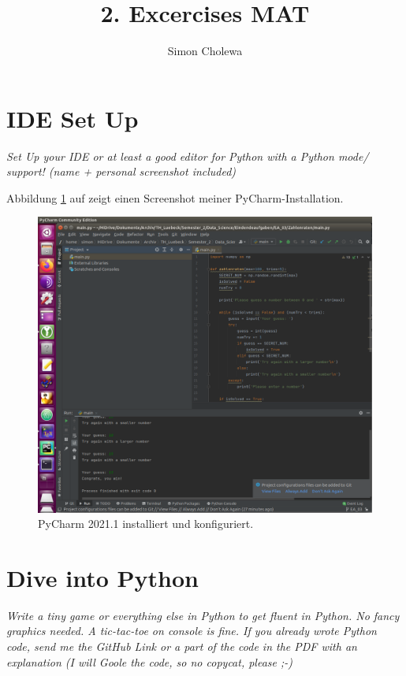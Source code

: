 \documentclass[11pt,a4paper]{article}
\author{Simon Cholewa}
\title{2. Excercises MAT}
\begin{document}
\maketitle

\section{IDE Set Up}
\textit{Set Up your IDE or at least a good editor for Python with a Python mode/ support! (name + personal screenshot included)}

Abbildung \ref{fig:pycharm} auf zeigt einen Screenshot meiner PyCharm-Installation.

\begin{figure}[!htbp] 
	\centering
	\includegraphics[width=1.0\linewidth]{images/PyCharm}
	\caption[PyCharm]{PyCharm 2021.1 installiert und konfiguriert.}
	\label{fig:pycharm}
\end{figure}


\section{Dive into Python}
\textit{Write a tiny game or everything else in Python to get fluent in Python. No fancy graphics needed. A tic-tac-toe on console is fine. If you already wrote Python code, send me the GitHub Link or a part of the code in the PDF with an explanation (I will Goole the code, so no copycat, please ;-)}
\end{document}

